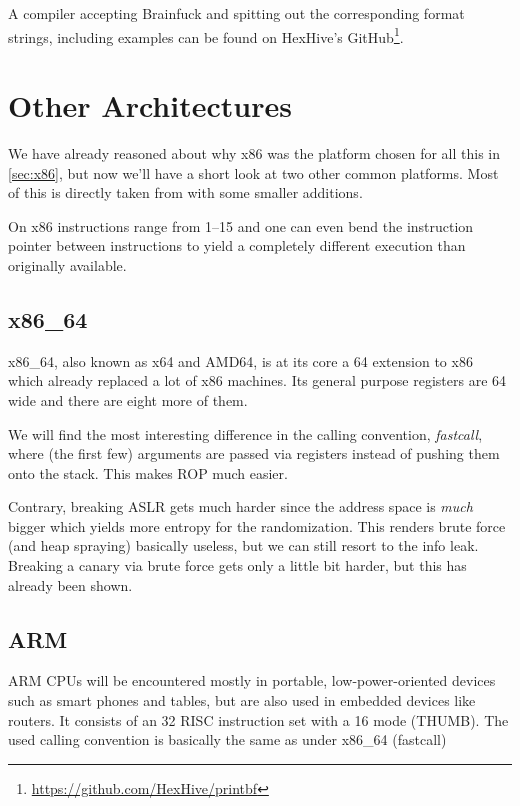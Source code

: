\documentclass[article]{uibk}
\begin{document}
A compiler accepting Brainfuck and spitting out the corresponding format
strings, including examples can be found on HexHive's
GitHub\footnote{\url{https://github.com/HexHive/printbf}}.

\section{Other Architectures}

We have already reasoned about why x86 was the platform chosen for all this in
\cref{sec:x86}, but now we'll have a short look at two other common platforms.
Most of this is directly taken from \cite{rpisec} with some smaller additions.

On x86 instructions range from \SIrange{1}{15}{\byte} and one can even bend the
instruction pointer between instructions to yield a completely different
execution than originally available.

\subsection{x86\_64}

x86\_64, also known as x64 and AMD64, is at its core a \SI{64}{\bit} extension
to x86 which already replaced a lot of x86 machines. Its general purpose
registers are \SI{64}{\bit} wide and there are eight more of them.

We will find the most interesting difference in the calling convention,
\textit{fastcall}, where (the first few) arguments are passed via registers
instead of pushing them onto the stack. This makes ROP much easier.

Contrary, breaking ASLR gets much harder since the address space is \emph{much}
bigger which yields more entropy for the randomization. This renders brute
force (and heap spraying) basically useless, but we can still resort to the
info leak. Breaking a canary via brute force gets only a little bit harder, but
this has already been shown.

\subsection{ARM}

ARM CPUs will be encountered mostly in portable, low-power-oriented devices
such as smart phones and tables, but are also used in embedded devices like
routers. It consists of an \SI{32}{\bit} RISC instruction set with a
\SI{16}{\bit} mode (THUMB). The used calling convention is basically the same
as under x86\_64 (fastcall)
\end{document}
